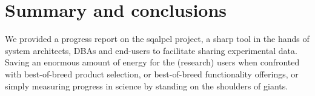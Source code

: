 \documentclass{cidr-2019}
\begin{document}




\section{Summary and conclusions}\label{Summary and conclusions}

We provided a progress report on the {\sc sqalpel} project, a sharp
tool in the hands of system architects, DBAs and end-users to
facilitate sharing experimental data.
Saving an enormous amount of energy for the (research) users when
confronted with best-of-breed product selection, or best-of-breed
functionality offerings, or simply measuring progress in science by
standing on the shoulders of giants.
\end{document}
